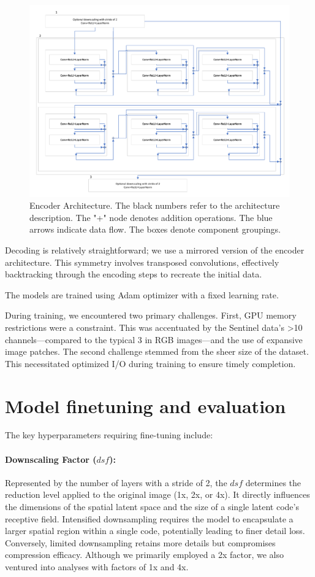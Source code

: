 \documentclass[runningheads]{llncs}
\begin{document}
\begin{figure}
\includegraphics[width=\textwidth]{figures/ArchitectureCompression.pdf}
\caption{Encoder Architecture. The black numbers refer to the architecture description. The "+" node denotes addition operations. The blue arrows indicate data flow. The boxes denote component groupings.}
\end{figure} 
 
Decoding is relatively straightforward; we use a mirrored version of the encoder architecture. This 
symmetry involves transposed convolutions, effectively backtracking through the encoding steps to 
recreate the initial data. 
 
The models are trained using Adam optimizer with a fixed learning rate. 
 
During training, we encountered two primary challenges. First, GPU memory restrictions were a 
constraint. This was accentuated by the Sentinel data’s >10 channels—compared to the typical 3 in 
RGB images—and the use of expansive image patches. The second challenge stemmed from the sheer 
size of the dataset. This necessitated optimized I/O during training to ensure timely completion.

\section{Model finetuning and evaluation}
The key hyperparameters requiring fine-tuning include: 
\paragraph{Downscaling Factor ($dsf$):} Represented by the number of layers with a stride of 2, the $dsf$ determines 
the reduction level applied to the original image (1x, 2x, or 4x). It directly influences the dimensions 
of the spatial latent space and the size of a single latent code's receptive field. Intensified 
downsampling requires the model to encapsulate a larger spatial region within a single code, 
potentially leading to finer detail loss. Conversely, limited downsampling retains more details but 
compromises compression efficacy. Although we primarily employed a 2x factor, we also ventured 
into analyses with factors of 1x and 4x. 
\end{document}
